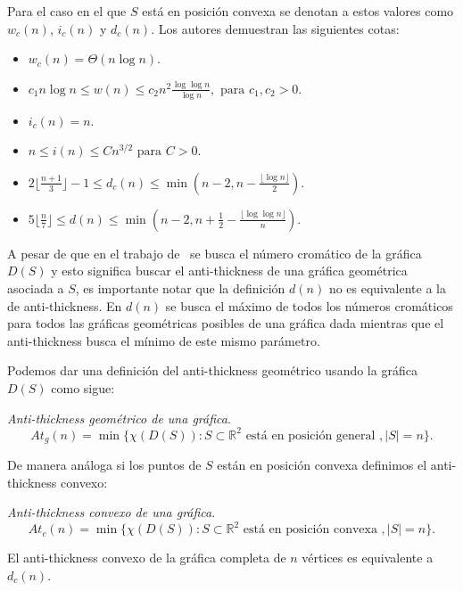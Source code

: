 Para el caso en el que $S$ está en posición convexa se denotan a estos valores como
$w_c(n)$, $i_c(n)$ y $d_c(n)$. Los autores demuestran las siguientes cotas:
\begin{itemize}
  \item $w_c(n) = \Theta(n\log n)$.
  \item $c_1n\log n \leq w(n) \leq c_2 n^2 \frac{\log\log n}{\log n}, \text{ para } c_1,c_2 > 0$.
  \item $i_c(n) = n$.
  \item $n \leq i(n) \leq Cn^{3/2} \text{ para } C > 0$.
  \item $2\lfloor \frac{n+1}{3}\rfloor -1 \leq d_c(n) \leq \min\left( n-2, n - \frac{\lfloor{\log n}\rfloor}{2}\right)$.
  \item $5\lfloor \frac{n}{7}\rfloor \leq d(n) \leq \min\left(n-2,n+\frac{1}{2}- \frac{\lfloor{\log \log n}\rfloor}{n}\right)$.
\end{itemize}

A pesar de que en el trabajo de~\cite{Araujo2005} se busca el número cromático
de la gráfica $D(S)$ y esto significa buscar el anti-thickness de una gráfica
geométrica asociada a $S$, es importante notar que la definición $d(n)$ no es
equivalente a la de anti-thickness. En $d(n)$ se busca el máximo de todos los
números cromáticos para todos las gráficas geométricas posibles de una gráfica
dada mientras que el anti-thickness busca el mínimo de este mismo parámetro.

Podemos dar una definición del anti-thickness geométrico usando la gráfica $D(S)$
como sigue:
\begin{definition}{\emph{Anti-thickness geométrico de una gráfica}.}
  \[At_g(n) = \min\{\chi(D(S)): S\subset \mathbb{R}^2 \text{ está en posición general }, |S|=n\}.\]
\end{definition}

De manera análoga si los puntos de $S$ están en posición convexa definimos el
anti-thickness convexo:

\begin{definition}{\emph{Anti-thickness convexo de una gráfica}.}
  \[At_c(n) = \min\{\chi(D(S)): S\subset \mathbb{R}^2 \text{ está en posición convexa }, |S|=n\}.\]
\end{definition}

El anti-thickness convexo de la gráfica completa de $n$ vértices es equivalente
a $d_c(n)$.

